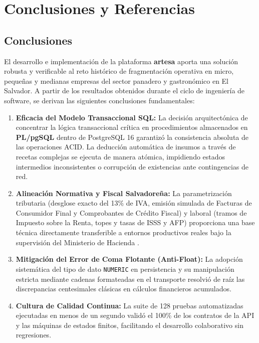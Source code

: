 \section{Conclusiones y Referencias}
\label{sec:conclusiones_referencias}

\subsection{Conclusiones}

El desarrollo e implementación de la plataforma \textbf{artesa} aporta una solución robusta y verificable al reto histórico de fragmentación operativa en micro, pequeñas y medianas empresas del sector panadero y gastronómico en El Salvador. A partir de los resultados obtenidos durante el ciclo de ingeniería de software, se derivan las siguientes conclusiones fundamentales:

\begin{enumerate}
    \item \textbf{Eficacia del Modelo Transaccional SQL:} La decisión arquitectónica de concentrar la lógica transaccional crítica en procedimientos almacenados en \textbf{PL/pgSQL} dentro de PostgreSQL 16 garantizó la consistencia absoluta de las operaciones ACID. La deducción automática de insumos a través de recetas complejas se ejecuta de manera atómica, impidiendo estados intermedios inconsistentes o corrupción de existencias ante contingencias de red.
    \item \textbf{Alineación Normativa y Fiscal Salvadoreña:} La parametrización tributaria (desglose exacto del 13\% de IVA, emisión simulada de Facturas de Consumidor Final y Comprobantes de Crédito Fiscal) y laboral (tramos de Impuesto sobre la Renta, topes y tasas de ISSS y AFP) proporciona una base técnica directamente transferible a entornos productivos reales bajo la supervisión del Ministerio de Hacienda \cite{mh_elsalvador_dte, asamblea_iva, asamblea_renta}.
    \item \textbf{Mitigación del Error de Coma Flotante (Anti-Float):} La adopción sistemática del tipo de dato \texttt{NUMERIC} en persistencia y su manipulación estricta mediante cadenas formateadas en el transporte resolvió de raíz las discrepancias centesimales clásicas en cálculos financieros acumulados.
    \item \textbf{Cultura de Calidad Continua:} La suite de 128 pruebas automatizadas ejecutadas en menos de un segundo validó el 100\% de los contratos de la API y las máquinas de estados finitos, facilitando el desarrollo colaborativo sin regresiones.
\end{enumerate}

